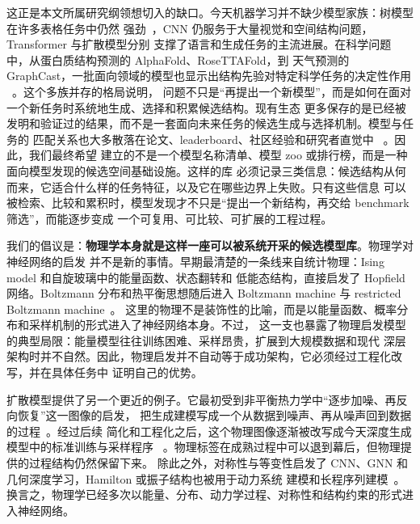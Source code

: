 \documentclass[11pt]{article}
\theoremstyle{definition}
\theoremstyle{plain}
\begin{document}
这正是本文所属研究纲领想切入的缺口。今天机器学习并不缺少模型家族：树模型在许多表格任务中仍然
强劲~\citep{grinsztajn2022tree}，CNN 仍服务于大量视觉和空间结构问题，Transformer 与扩散模型分别
支撑了语言和生成任务的主流进展。在科学问题中，从蛋白质结构预测的 AlphaFold、RoseTTAFold，到
天气预测的 GraphCast，一批面向领域的模型也显示出结构先验对特定科学任务的决定性作用
~\citep{jumper2021highly,baek2021accurate,lam2023learning}。这个多族并存的格局说明，
问题不只是“再提出一个新模型”，而是如何在面对一个新任务时系统地生成、选择和积累候选结构。现有生态
更多保存的是已经被发明和验证过的结果，而不是一套面向未来任务的候选生成与选择机制。模型与任务的
匹配关系也大多散落在论文、leaderboard、社区经验和研究者直觉中
~\citep{lipton2018troubling,elsken2019neural,he2021automl,radosavovic2020designing}。因此，我们最终希望
建立的不是一个模型名称清单、模型 zoo 或排行榜，而是一种面向模型发现的候选空间基础设施。这样的库
必须记录三类信息：候选结构从何而来，它适合什么样的任务特征，以及它在哪些边界上失败。只有这些信息
可以被检索、比较和累积时，模型发现才不只是“提出一个新结构，再交给 benchmark 筛选”，而能逐步变成
一个可复用、可比较、可扩展的工程过程。

我们的倡议是：\textbf{物理学本身就是这样一座可以被系统开采的候选模型库}。物理学对神经网络的启发
并不是新的事情。早期最清楚的一条线来自统计物理：Ising model 和自旋玻璃中的能量函数、状态翻转和
低能态结构，直接启发了 Hopfield 网络。Boltzmann 分布和热平衡思想随后进入 Boltzmann machine 与
restricted Boltzmann machine~\citep{hopfield1982neural,hinton1985learning,smolensky1986information}。
这里的物理不是装饰性的比喻，而是以能量函数、概率分布和采样机制的形式进入了神经网络本身。不过，
这一支也暴露了物理启发模型的典型局限：能量模型往往训练困难、采样昂贵，扩展到大规模数据和现代
深层架构时并不自然。因此，物理启发并不自动等于成功架构，它必须经过工程化改写，并在具体任务中
证明自己的优势。

扩散模型提供了另一个更近的例子。它最初受到非平衡热力学中“逐步加噪、再反向恢复”这一图像的启发，
把生成建模写成一个从数据到噪声、再从噪声回到数据的过程~\citep{sohldickstein2015deep}。经过后续
简化和工程化之后，这个物理图像逐渐被改写成今天深度生成模型中的标准训练与采样程序
~\citep{ho2020denoising}。物理标签在成熟过程中可以退到幕后，但物理提供的过程结构仍然保留下来。
除此之外，对称性与等变性启发了 CNN、GNN 和几何深度学习，Hamilton 或振子结构也被用于动力系统
建模和长程序列建模~\citep{bronstein2021geometric,greydanus2019hamiltonian,rusch2021coupled,rusch2024oscillatory}。
换言之，物理学已经多次以能量、分布、动力学过程、对称性和结构约束的形式进入神经网络。
\end{document}
